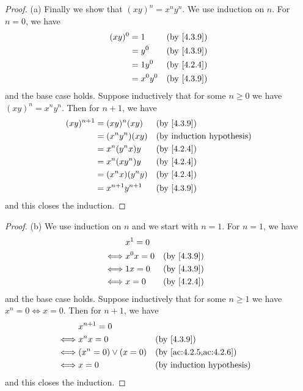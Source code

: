 \begin{proof}{(a)}
	Finally we show that \((xy)^n = x^n y^n\).
	We use induction on \(n\).
	For \(n = 0\), we have
	\begin{align*}
		(xy)^0 & = 1       &  & \by{4.3.9} \\
		       & = y^0     &  & \by{4.3.9} \\
		       & = 1y^0    &  & \by{4.2.4} \\
		       & = x^0 y^0 &  & \by{4.3.9}
	\end{align*}
	and the base case holds.
	Suppose inductively that for some \(n \geq 0\) we have \((xy)^n = x^n y^n\).
	Then for \(n + 1\), we have
	\begin{align*}
		(xy)^{n + 1} & = (xy)^n (xy)         &  & \by{4.3.9} \\
		             & = (x^n y^n) (xy)      &  & \byIH      \\
		             & = x^n (y^n x) y       &  & \by{4.2.4} \\
		             & = x^n (x y^n) y       &  & \by{4.2.4} \\
		             & = (x^n x)(y^n y)      &  & \by{4.2.4} \\
		             & = x^{n + 1} y^{n + 1} &  & \by{4.3.9}
	\end{align*}
	and this closes the induction.
\end{proof}

\begin{proof}{(b)}
	We use induction on \(n\) and we start with \(n = 1\).
	For \(n = 1\), we have
	\begin{align*}
		     & x^1 = 0                   \\
		\iff & x^0 x = 0 &  & \by{4.3.9} \\
		\iff & 1x = 0    &  & \by{4.3.9} \\
		\iff & x = 0     &  & \by{4.2.4}
	\end{align*}
	and the base case holds.
	Suppose inductively that for some \(n \geq 1\) we have \(x^n = 0 \iff x = 0\).
	Then for \(n + 1\), we have
	\begin{align*}
		     & x^{n + 1} = 0                                                    \\
		\iff & x^n x = 0              &  & \by{4.3.9}                           \\
		\iff & (x^n = 0) \lor (x = 0) &  & \text{(by \cref{ac:4.2.5,ac:4.2.6})} \\
		\iff & x = 0                  &  & \byIH
	\end{align*}
	and this closes the induction.
\end{proof}


